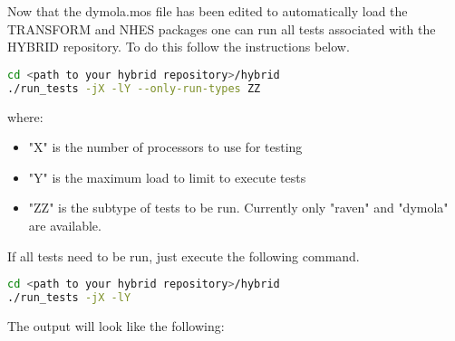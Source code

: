 Now that the dymola.mos file has been edited to automatically load the TRANSFORM and NHES packages one can run all tests associated with the HYBRID repository. To do this follow the instructions below. 

\begin{lstlisting}[language=bash]
cd <path to your hybrid repository>/hybrid
./run_tests -jX -lY --only-run-types ZZ
\end{lstlisting}
where:
\begin{itemize}
\item "X" is the number of processors to use for testing
\item "Y" is the maximum load to limit to execute tests
\item "ZZ" is the subtype of tests to be run. Currently only "raven" and "dymola" are available.
\end{itemize}

If all tests need to be run, just execute the following command.
\begin{lstlisting}[language=bash]
cd <path to your hybrid repository>/hybrid
./run_tests -jX -lY
\end{lstlisting}
The output will look like the following:

